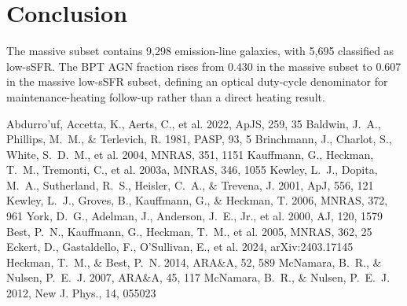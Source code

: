\documentclass[twocolumn]{aastex631}
\begin{document}
\section{Conclusion}\label{sec:conclusion}
The massive subset contains 9,298 emission-line galaxies, with 5,695 classified as low-sSFR. The BPT AGN fraction rises from 0.430 in the massive subset to 0.607 in the massive low-sSFR subset, defining an optical duty-cycle denominator for maintenance-heating follow-up rather than a direct heating result.


\begin{thebibliography}{}
 Abdurro'uf, Accetta, K., Aerts, C., et al. 2022, ApJS, 259, 35
 Baldwin, J.~A., Phillips, M.~M., \& Terlevich, R. 1981, PASP, 93, 5
 Brinchmann, J., Charlot, S., White, S.~D.~M., et al. 2004, MNRAS, 351, 1151
 Kauffmann, G., Heckman, T.~M., Tremonti, C., et al. 2003a, MNRAS, 346, 1055
 Kewley, L.~J., Dopita, M.~A., Sutherland, R.~S., Heisler, C.~A., \& Trevena, J. 2001, ApJ, 556, 121
 Kewley, L.~J., Groves, B., Kauffmann, G., \& Heckman, T. 2006, MNRAS, 372, 961
 York, D.~G., Adelman, J., Anderson, J.~E., Jr., et al. 2000, AJ, 120, 1579
 Best, P.~N., Kauffmann, G., Heckman, T.~M., et al. 2005, MNRAS, 362, 25
 Eckert, D., Gastaldello, F., O'Sullivan, E., et al. 2024, arXiv:2403.17145
 Heckman, T.~M., \& Best, P.~N. 2014, ARA\&A, 52, 589
 McNamara, B.~R., \& Nulsen, P.~E.~J. 2007, ARA\&A, 45, 117
 McNamara, B.~R., \& Nulsen, P.~E.~J. 2012, New J. Phys., 14, 055023
\end{thebibliography}
\end{document}
